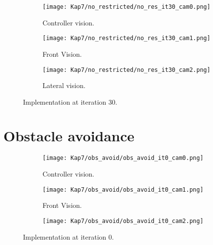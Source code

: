 
\begin{figure}
\centering
\begin{subfigure}[t]{\textwidth}
    \texttt{[image: Kap7/no\_restricted/no\_res\_it30\_cam0.png]}
    \caption{Controller vision.}
    \label{fig:first}
\end{subfigure}
\vspace{1cm}
\begin{subfigure}[b]{0.4\textwidth}
    \texttt{[image: Kap7/no\_restricted/no\_res\_it30\_cam1.png]}
    \caption{Front Vision.}
    \label{fig:second}
\end{subfigure}
\hfill
\begin{subfigure}[b]{0.50\textwidth}
    \texttt{[image: Kap7/no\_restricted/no\_res\_it30\_cam2.png]}
    \caption{Lateral vision.}
    \label{fig:third}
\end{subfigure}
\caption{Implementation at iteration 30.}
\label{fig:figures}
\end{figure}
\section{Obstacle avoidance}

\begin{figure}
\centering
\begin{subfigure}[t]{\textwidth}
    \texttt{[image: Kap7/obs\_avoid/obs\_avoid\_it0\_cam0.png]}
    \caption{Controller vision.}
    \label{fig:first}
\end{subfigure}
\vspace{1cm}
\begin{subfigure}[b]{0.4\textwidth}
    \texttt{[image: Kap7/obs\_avoid/obs\_avoid\_it0\_cam1.png]}
    \caption{Front Vision.}
    \label{fig:second}
\end{subfigure}
\hfill
\begin{subfigure}[b]{0.50\textwidth}
    \texttt{[image: Kap7/obs\_avoid/obs\_avoid\_it0\_cam2.png]}
    \label{fig:third}
\end{subfigure}
\caption{Implementation at iteration 0.}
\label{fig:figures}
\end{figure}




